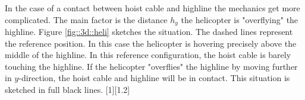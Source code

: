 \documentclass[a4paper,10pt]{scrartcl}
\begin{document}
In the case of a contact between hoist cable and highline the mechanics get more complicated. The main factor is the distance $h_y$ the helicopter is "overflying" the highline. Figure \ref{fig::3d::heli} sketches the situation. The dashed lines represent the reference position. In this case the helicopter is hovering precisely above the middle of the highline. In this reference configuration, the hoist cable is barely touching the highline. If the helicopter "overflies" the highline by moving further in $y$-direction, the hoist cable and highline will be in contact. This situation is sketched in full black lines. 
[1][1.2] 
\begin{figure}[ht]
\centering

\end{figure}
\end{document}
